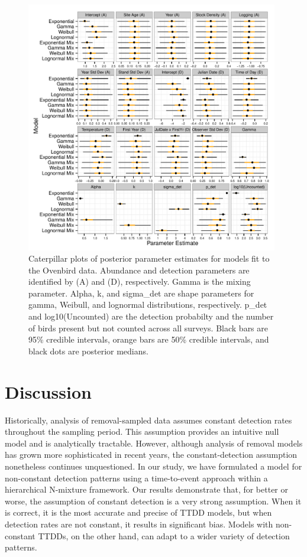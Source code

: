 \documentclass[useAMS,usenatbib,referee,12pt]{article}
\begin{document}
\begin{figure}[h!]
\includegraphics[width=0.98\textwidth]{OVEN/oven_sum/OVEN_posteriors.pdf}
\caption{\label{ovenposteriors} Caterpillar plots of posterior parameter estimates for models fit to the Ovenbird data.  
Abundance and detection parameters are identified by (A) and (D), respectively.  
Gamma is the mixing parameter.  
Alpha, k, and sigma\_det are shape parameters for gamma, Weibull, and lognormal distributions, respectively.  
p\_det and log10(Uncounted) are the detection probabilty and the number of birds present but not counted across all surveys.  
Black bars are 95\% credible intervals, orange bars are 50\% credible intervals, and black dots are posterior medians.}
\end{figure}






\section{Discussion}

Historically, analysis of removal-sampled data assumes constant detection rates throughout the sampling period.  
This assumption provides an intuitive null model and is analytically tractable.  
However, although analysis of removal models has grown more sophisticated in recent years, the constant-detection assumption nonetheless continues unquestioned.  
In our study, we have formulated a model for non-constant detection patterns using a time-to-event approach within a hierarchical N-mixture framework.  
Our results demonstrate that, for better or worse, the assumption of constant detection is a very strong assumption.  
When it is correct, it is the most accurate and precise of TTDD models, but when detection rates are not constant, it results in significant bias.  
Models with non-constant TTDDs, on the other hand, can adapt to a wider variety of detection patterns.
\end{document}
